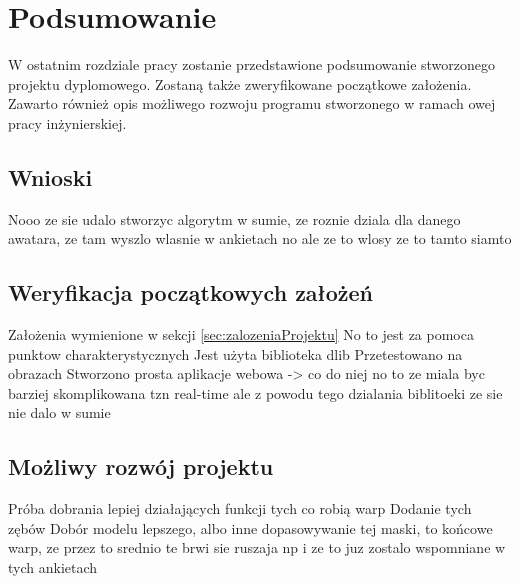 \chapter{Podsumowanie}
\label{cha:podsumowanie}
W ostatnim rozdziale pracy zostanie przedstawione podsumowanie stworzonego projektu dyplomowego. Zostaną także zweryfikowane początkowe założenia. Zawarto również opis możliwego rozwoju programu stworzonego w ramach owej pracy inżynierskiej.
\section{Wnioski}
Nooo ze sie udalo stworzyc algorytm w sumie, ze roznie dziala dla danego awatara, ze tam wyszlo wlasnie w ankietach
no ale ze to wlosy ze to tamto siamto

\section{Weryfikacja początkowych założeń}
Założenia wymienione w sekcji \ref{sec:zalozeniaProjektu}
No to jest za pomoca punktow charakterystycznych
Jest użyta biblioteka dlib
Przetestowano na obrazach
Stworzono prosta aplikacje webowa -> co do niej no to ze miala byc barziej skomplikowana tzn real-time ale z powodu tego dzialania biblitoeki ze sie nie dalo w sumie

\section{Możliwy rozwój projektu}
Próba dobrania lepiej działających funkcji tych co robią warp
Dodanie tych zębów
Dobór modelu lepszego, albo inne dopasowywanie tej maski, to końcowe warp, ze przez to srednio te brwi sie ruszaja np i ze to juz zostalo wspomniane w tych ankietach

